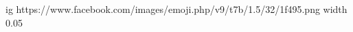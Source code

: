  
 
 
 
 

\ifcmt
  ig https://www.facebook.com/images/emoji.php/v9/t7b/1.5/32/1f495.png
  width 0.05
\fi
